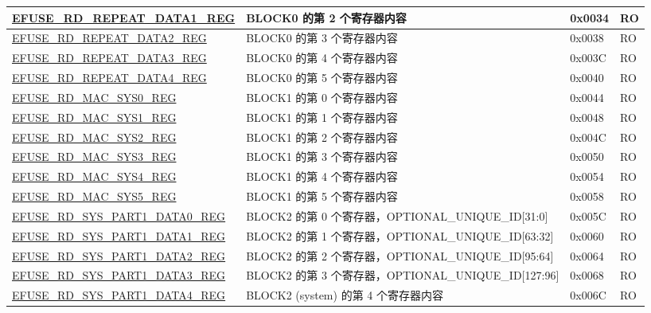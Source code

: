 \begin{longtable}{ | p{6.8cm} | p{7cm} | p{1.3cm} | p{1.2cm} | }
    \hyperref[regdesc:EFUSERDREPEATDATA1REG]{EFUSE\_RD\_REPEAT\_DATA1\_REG} & BLOCK0 的第 2 个寄存器内容 & 0x0034 & RO \\ \hline
    \hyperref[regdesc:EFUSERDREPEATDATA2REG]{EFUSE\_RD\_REPEAT\_DATA2\_REG} & BLOCK0 的第 3 个寄存器内容 & 0x0038 & RO \\ \hline
    \hyperref[regdesc:EFUSERDREPEATDATA3REG]{EFUSE\_RD\_REPEAT\_DATA3\_REG} & BLOCK0 的第 4 个寄存器内容 & 0x003C & RO \\ \hline
    \hyperref[regdesc:EFUSERDREPEATDATA4REG]{EFUSE\_RD\_REPEAT\_DATA4\_REG} & BLOCK0 的第 5 个寄存器内容 & 0x0040 & RO \\ \hline
    \hyperref[regdesc:EFUSERDMACSYS0REG]{EFUSE\_RD\_MAC\_SYS0\_REG} & BLOCK1 的第 0 个寄存器内容 & 0x0044 & RO \\ \hline
    \hyperref[regdesc:EFUSERDMACSYS1REG]{EFUSE\_RD\_MAC\_SYS1\_REG} & BLOCK1 的第 1 个寄存器内容 & 0x0048 & RO \\ \hline
    \hyperref[regdesc:EFUSERDMACSYS2REG]{EFUSE\_RD\_MAC\_SYS2\_REG} & BLOCK1 的第 2 个寄存器内容 & 0x004C & RO \\ \hline
    \hyperref[regdesc:EFUSERDMACSYS3REG]{EFUSE\_RD\_MAC\_SYS3\_REG} & BLOCK1 的第 3 个寄存器内容 & 0x0050 & RO \\ \hline
    \hyperref[regdesc:EFUSERDMACSYS4REG]{EFUSE\_RD\_MAC\_SYS4\_REG} & BLOCK1 的第 4 个寄存器内容 & 0x0054 & RO \\ \hline
    \hyperref[regdesc:EFUSERDMACSYS5REG]{EFUSE\_RD\_MAC\_SYS5\_REG} & BLOCK1 的第 5 个寄存器内容 & 0x0058 & RO \\ \hline
    \hyperref[regdesc:EFUSERDSYSPART1DATA0REG]{EFUSE\_RD\_SYS\_PART1\_DATA0\_REG} & BLOCK2 的第 0 个寄存器，OPTIONAL\_UNIQUE\_ID[31:0] & 0x005C & RO \\ \hline
    \hyperref[regdesc:EFUSERDSYSPART1DATA1REG]{EFUSE\_RD\_SYS\_PART1\_DATA1\_REG} & BLOCK2 的第 1 个寄存器，OPTIONAL\_UNIQUE\_ID[63:32] & 0x0060 & RO \\ \hline
    \hyperref[regdesc:EFUSERDSYSPART1DATA2REG]{EFUSE\_RD\_SYS\_PART1\_DATA2\_REG} & BLOCK2 的第 2 个寄存器，OPTIONAL\_UNIQUE\_ID[95:64] & 0x0064 & RO \\ \hline
    \hyperref[regdesc:EFUSERDSYSPART1DATA3REG]{EFUSE\_RD\_SYS\_PART1\_DATA3\_REG} & BLOCK2 的第 3 个寄存器，OPTIONAL\_UNIQUE\_ID[127:96] & 0x0068 & RO \\ \hline
    \hyperref[regdesc:EFUSERDSYSPART1DATA4TO7REG]{EFUSE\_RD\_SYS\_PART1\_DATA4\_REG} & BLOCK2 (system) 的第 4 个寄存器内容 & 0x006C & RO \\ \hline

\end{longtable}
